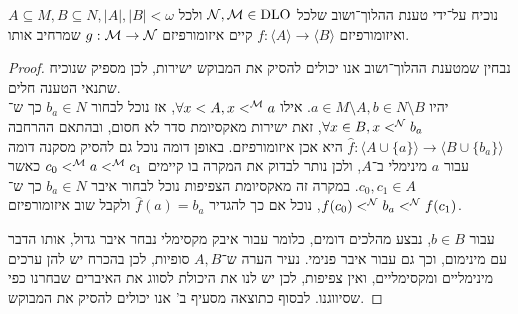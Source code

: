 \subquestion{}
נוכיח על־ידי טענת ההלוך־ושוב שלכל $\mathcal{N}, \mathcal{M} \in \operatorname{DLO}$ ולכל $A \subseteq M, B \subseteq N, |A|, |B| < \omega$ ואיזומורפיזם $f : \langle A \rangle \to \langle B \rangle$ קיים איזומורפיזם $g : \mathcal{M} \to \mathcal{N}$ שמרחיב אותו.
\begin{proof}
	נבחין שמטענת ההלוך־ושוב אנו יכולים להסיק את המבוקש ישירות, לכן מספיק שנוכיח שתנאי הטענה חלים. \\
	יהיו $a \in M \setminus A, b \in N \setminus B$.
	אילו $\forall x < A, x <^{\mathcal{M}} a$, אז נוכל לבחור $b_a \in N$ כך ש־$\forall x \in B, x <^{\mathcal{N}} b_a$, זאת ישירות מאקסיומת סדר לא חסום,
	ובהתאם ההרחבה $\hat{f} : \langle A \cup \{ a \} \rangle \to \langle B \cup \{ b_a \}\rangle$ היא אכן איזומורפיזם.
	באופן דומה נוכל גם להסיק מסקנה דומה עבור $a$ מינימלי ב־$A$, ולכן נותר לבדוק את המקרה בו קיימים $c_0 <^{\mathcal{M}} a <^{\mathcal{M}} c_1$ כאשר $c_0, c_1 \in A$.
	במקרה זה מאקסיומת הצפיפות נוכל לבחור איבר $b_a \in N$ כך ש־$f(c_0) <^{\mathcal{N}} b_a <^{\mathcal{N}} f(c_1)$, נוכל אם כך להגדיר $\hat{f}(a) = b_a$ ולקבל שוב איזומורפיזם.

	עבור $b \in B$, נבצע מהלכים דומים, כלומר עבור איבק מקסימלי נבחר איבר גדול, אותו הדבר עם מינימום, וכך גם עבור איבר פנימי.
	נעיר הערה ש־$A, B$ סופיות, לכן בהכרח יש להן ערכים מינימליים ומקסימליים, ואין צפיפות, לכן יש לנו את היכולת לסווג את האיברים שבחרנו כפי שסיווגנו.
	לבסוף כתוצאה מסעיף ב' אנו יכולים להסיק את המבוקש.
\end{proof}

